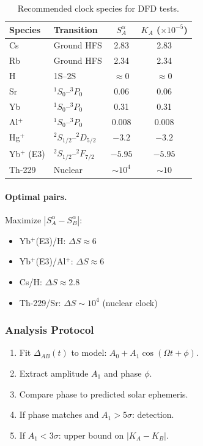 \begin{table}[h]
\centering
\caption{Recommended clock species for DFD tests.}\label{tab:clock-species}
\begin{tabular}{llcc}
\toprule
Species & Transition & $S_A^\alpha$ & $K_A$ ($\times 10^{-5}$) \\
\midrule
Cs & Ground HFS & 2.83 & 2.83 \\
Rb & Ground HFS & 2.34 & 2.34 \\
H & 1S--2S & $\approx 0$ & $\approx 0$ \\
Sr & ${}^1S_0$--${}^3P_0$ & 0.06 & 0.06 \\
Yb & ${}^1S_0$--${}^3P_0$ & 0.31 & 0.31 \\
Al$^+$ & ${}^1S_0$--${}^3P_0$ & 0.008 & 0.008 \\
Hg$^+$ & ${}^2S_{1/2}$--${}^2D_{5/2}$ & $-3.2$ & $-3.2$ \\
Yb$^+$ (E3) & ${}^2S_{1/2}$--${}^2F_{7/2}$ & $-5.95$ & $-5.95$ \\
Th-229 & Nuclear & $\sim 10^4$ & $\sim 10$ \\
\bottomrule
\end{tabular}
\end{table}

\paragraph{Optimal pairs.}
Maximize $|S_A^\alpha - S_B^\alpha|$:
\begin{itemize}
\item Yb$^+$(E3)/H: $\Delta S \approx 6$
\item Yb$^+$(E3)/Al$^+$: $\Delta S \approx 6$
\item Cs/H: $\Delta S \approx 2.8$
\item Th-229/Sr: $\Delta S \sim 10^4$ (nuclear clock)
\end{itemize}

\subsubsection{Analysis Protocol}

\begin{enumerate}
\item Fit $\Delta_{AB}(t)$ to model: $A_0 + A_1\cos(\Omega t + \phi)$.
\item Extract amplitude $A_1$ and phase $\phi$.
\item Compare phase to predicted solar ephemeris.
\item If phase matches and $A_1 > 5\sigma$: detection.
\item If $A_1 < 3\sigma$: upper bound on $|K_A - K_B|$.
\end{enumerate}

